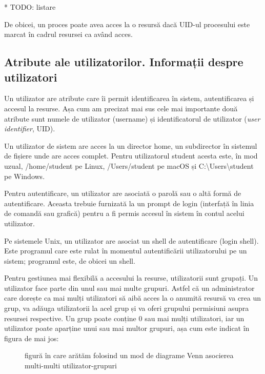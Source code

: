 * TODO: listare

De obicei, un proces poate avea acces la o resursă dacă UID-ul procesului este
marcat în cadrul resursei ca având acces.

\subsection{Atribute ale utilizatorilor. Informații despre utilizatori}
\label{sec:users-ops-atribute}

Un utilizator are atribute care îi permit identificarea în sistem,
autentificarea și accesul la resurse. Așa cum am precizat mai sus cele mai
importante două atribute sunt numele de utilizator (username) și identificatorul
de utilizator (\textit{user identifier}, UID).

Un utilizator de sistem are acces la un director home, un subdirector în
sistemul de fișiere unde are acces complet. Pentru utilizatorul student acesta
este, în mod uzual, /home/student pe Linux, /Users/student pe macOS și
C:\textbackslash{}Users\textbackslash{}student pe Windows.

Pentru autentificare, un utilizator are asociată o parolă sau o altă formă de
autentificare. Aceasta trebuie furnizată la un prompt de login (interfață în
linia de comandă sau grafică) pentru a fi permis accesul în sistem în contul
acelui utilizator.

Pe sistemele Unix, un utilizator are asociat un shell de autentificare (login
shell). Este programul care este rulat în momentul autentificării utilizatorului
pe un sistem; programul este, de obicei un shell.

Pentru gestiunea mai flexibilă a accesului la resurse, utilizatorii sunt
grupați. Un utilizator face parte din unul sau mai multe grupuri. Astfel că un
administrator care dorește ca mai mulți utilizatori să aibă acces la o anumită
resursă va crea un grup, va adăuga utilizatorii la acel grup și va oferi
grupului permisiuni asupra resursei respective. Un grup poate conține 0 sau mai
mulți utilizatori, iar un utilizator poate aparține unui sau mai multor grupuri,
așa cum este indicat în figura de mai jos:

\begin{figure}[htbp]
	\centering
	\def\svgwidth{\columnwidth}
	
	\caption{figură în care arătăm folosind un mod de diagrame Venn
		asocierea multi-multi utilizator-grupuri}
	\label{fig:user-multi-user}
\end{figure}

